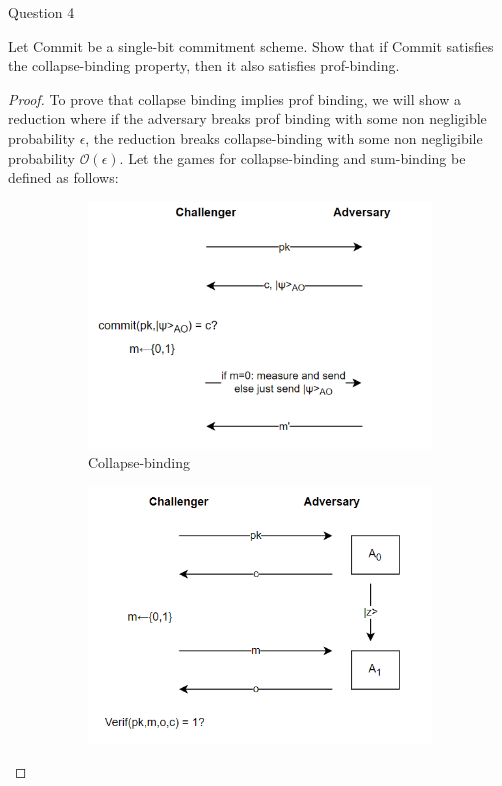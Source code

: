 \begin{solution}{Question 4}\label{ques:4}
    \begin{question}
    Let Commit be a single-bit commitment scheme. Show that if Commit satisfies the collapse-binding property, then it also satisfies prof-binding.
    \end{question}
    \tcblower{}
    \begin{proof}
    To prove that collapse binding implies prof binding, we will show a reduction where if the adversary breaks prof binding with some non negligible probability $\epsilon$, the reduction breaks collapse-binding with some non negligibile probability $\mathcal{O}(\epsilon)$. Let the games for collapse-binding and sum-binding be defined as follows:\\
    \begin{figure}[H]
      \begin{subfigure}[b]{0.5\textwidth}
        \includegraphics[width=\textwidth]{PS4/images/collapse.png}
        \caption{Collapse-binding}
        \label{fig:cb}
      \end{subfigure}
      \hfill
      \begin{subfigure}[b]{0.48\textwidth}
        \includegraphics[width=\textwidth]{PS4/images/prof.png}

\end{subfigure}
\end{figure}
\end{proof}
\end{solution}
